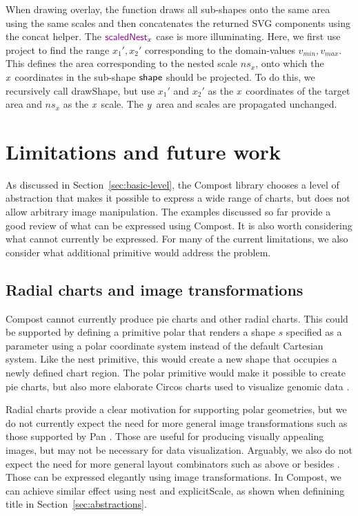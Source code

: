 \documentclass{jfp}
\newcommand{\X}{\emph{x}\ }
\newcommand{\Y}{\emph{y}\ }
\newcommand{\ident}[1]{\textnormal{\textcolor{idclr}{\sffamily #1}}}
\newcommand{\kvd}[1]{\textnormal{\textcolor{kvdclr}{\sffamily #1}}}
\begin{document}
\vspace{-0.5em}
\noindent
When drawing \kvd{overlay}, the function draws all sub-shapes onto the same
area using the same scales and then concatenates the returned SVG components using the \ident{concat} helper.
The $\kvd{scaledNest}_x$ case is more illuminating. Here, we first
use \ident{project} to find the range $x_1', x_2'$ corresponding to the domain-values
$v_{min},v_{max}$. This defines the area corresponding to the nested scale ${ns}_x$, onto
which the \X coordinates in the sub-shape $\ident{shape}$ should be projected.
To do this, we recursively call \ident{drawShape}, but use $x_1'$ and $x_2'$ as the \X coordinates
of the target area and ${ns}_x$ as the \X scale. The \Y area and scales are propagated unchanged.

\section{Limitations and future work}
\label{sec:limits}

As discussed in Section~\ref{sec:basic-level}, the Compost library chooses a level of abstraction
that makes it possible to express a wide range of charts, but does not allow arbitrary image
manipulation. The examples discussed so far provide a good review of what can be expressed
using Compost. It is also worth considering what cannot currently be expressed. For many of the
current limitations, we also consider what additional primitive would address the problem.

\subsection{Radial charts and image transformations}
Compost cannot currently produce pie charts and other radial charts. This could be supported by
defining a primitive \kvd{polar} that renders a shape $s$ specified as a parameter using
a polar coordinate system instead of the default Cartesian system. Like the \kvd{nest} primitive,
this would create a new shape that occupies a newly defined chart region. The \kvd{polar}
primitive would make it possible to create pie charts, but also more elaborate Circos charts
used to visualize genomic data \cite{circos}.

Radial charts provide a clear motivation for supporting polar geometries, but we do not currently
expect the need for more general image transformations such as those supported by Pan \cite{fun}.
Those are useful for producing visually appealing images, but may not be necessary for data
visualization. Arguably, we also do not expect the need for more general layout combinators such
as \ident{above} or \ident{besides}  \cite{monoids}. Those can be expressed elegantly using image transformations.
In Compost, we can achieve similar effect using \kvd{nest} and \kvd{explicitScale}, as shown when
definining \ident{title} in Section~\ref{sec:abstractions}.
\end{document}
